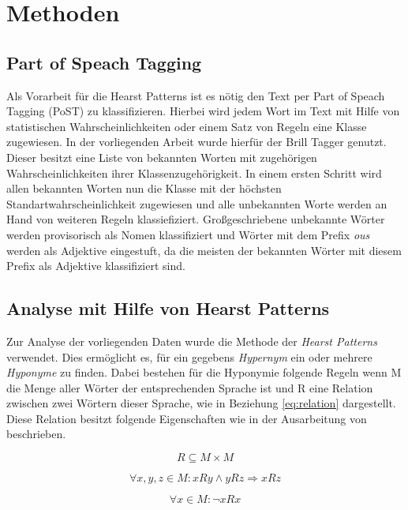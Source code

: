 \section{Methoden}
\subsection{Part of Speach Tagging}
Als Vorarbeit für die Hearst Patterns ist es nötig den Text per Part of Speach Tagging (PoST) zu klassifizieren.
Hierbei wird jedem Wort im Text mit Hilfe von statistischen Wahrscheinlichkeiten oder einem Satz von Regeln eine Klasse zugewiesen.
In der vorliegenden Arbeit wurde hierfür der Brill Tagger genutzt. Dieser besitzt eine Liste von bekannten Worten mit zugehörigen
Wahrscheinlichkeiten ihrer Klassenzugehörigkeit. In einem ersten Schritt wird allen bekannten Worten nun die Klasse mit der höchsten
Standartwahrscheinlichkeit zugewiesen und alle unbekannten Worte werden an Hand von weiteren Regeln klassiefiziert. Großgeschriebene 
unbekannte Wörter werden provisorisch als Nomen klassifiziert und Wörter mit dem Prefix \textit{ous} werden als Adjektive eingestuft,
da die meisten der bekannten Wörter mit diesem Prefix als Adjektive klassifiziert sind. 

\subsection{Analyse mit Hilfe von Hearst Patterns}

Zur Analyse der vorliegenden Daten wurde die Methode der \textit{Hearst Patterns} verwendet. 
Dies ermöglicht es, für ein gegebens \textit{Hypernym} ein oder mehrere \textit{Hyponyme} zu finden. 
Dabei bestehen für die Hyponymie folgende Regeln wenn M die Menge aller Wörter der 
entsprechenden Sprache ist und R eine Relation zwischen zwei Wörtern dieser Sprache, wie in Beziehung \ref{eq:relation} dargestellt.
Diese Relation besitzt folgende Eigenschaften wie in der Ausarbeitung von \cite{bib:Snow2004} beschrieben.

\begin{equation}
  \label{eq:relation}
  R \subseteq M \times M
\end{equation}

\begin{equation}
  \label{eq:trans}
  \forall x, y, z \in M : xRy \land yRz \Rightarrow xRz
\end{equation}

\begin{equation}
  \label{eq:irref}
  \forall x \in M : \neg xRx
\end{equation}

